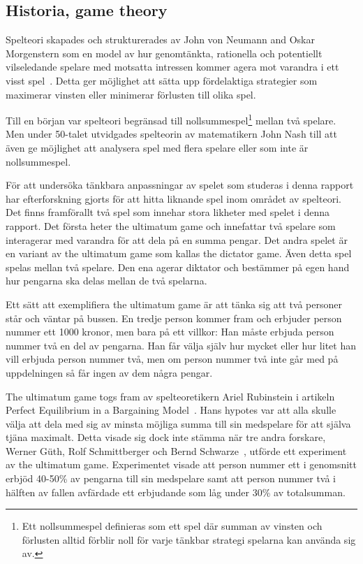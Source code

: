 \subsection{Historia, game theory}
Spelteori skapades och strukturerades av John von Neumann and Oskar Morgenstern som en model av hur genomtänkta, rationella och potentiellt vilseledande spelare med motsatta intressen kommer agera mot varandra i ett visst spel~\cite{Flake:2001}. Detta ger möjlighet att sätta upp fördelaktiga strategier som maximerar vinsten eller minimerar förlusten till olika spel.

Till en början var spelteori begränsad till nollsummespel\footnote{Ett nollsummespel definieras som ett spel där summan av vinsten och förlusten alltid förblir noll för varje tänkbar strategi spelarna kan använda sig av.} mellan två spelare. Men under 50-talet utvidgades spelteorin av matematikern John Nash till att även ge möjlighet att analysera spel med flera spelare eller som inte är nollsummespel. 

För att undersöka tänkbara anpassningar av spelet som studeras i denna rapport har efterforskning gjorts för att hitta liknande spel inom området av spelteori. Det finns framförallt två spel som innehar stora likheter med spelet i denna rapport. Det första heter the ultimatum game och innefattar två spelare som interagerar med varandra för att dela på en summa pengar. Det andra spelet är en variant av the ultimatum game som kallas the dictator game. Även detta spel spelas mellan två spelare. Den ena agerar diktator och bestämmer på egen hand hur pengarna ska delas mellan de två spelarna.

Ett sätt att exemplifiera the ultimatum game är att tänka sig att två personer står och väntar på bussen. En tredje person kommer fram och erbjuder person nummer ett 1000 kronor, men bara på ett villkor: Han måste erbjuda person nummer två en del av pengarna. Han får välja själv hur mycket eller hur litet han vill erbjuda person nummer två, men om person nummer två inte går med på uppdelningen så får ingen av dem några pengar.

The ultimatum game togs fram av spelteoretikern Ariel Rubinstein i artikeln Perfect Equilibrium in a Bargaining Model~\cite{Rubinstein:1982}. Hans hypotes var att alla skulle välja att dela med sig av minsta möjliga summa till sin medspelare för att själva tjäna maximalt. Detta visade sig dock inte stämma när tre andra forskare, Werner Güth, Rolf Schmittberger och Bernd Schwarze~\cite{Werner:1982}, utförde ett experiment av the ultimatum game. Experimentet visade att person nummer ett i genomsnitt erbjöd 40-50\% av pengarna till sin medspelare samt att person nummer två i hälften av fallen avfärdade ett erbjudande som låg under 30\% av totalsumman.

